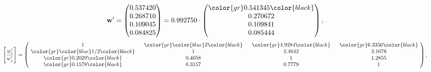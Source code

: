 \begin{example}
\begin{equation*}
\mathbf{w}^{\prime} =
\begin{pmatrix}
0.537420\\
0.268710\\
0.109045\\
0.084825
\end{pmatrix} =
0.992750\cdot
\begin{pmatrix}
\color{gr} 0.541345\color{black} \\
0.270672\\
0.109841\\
0.085444
\end{pmatrix},
\end{equation*}
\begin{equation*}
\left[ \frac{{w}^{\prime}_i}{{w}^{\prime}_j} \right] =
\begin{pmatrix}
$\,\,$ 1 $\,\,$ & $\,\,$\color{gr} \color{blue} 2\color{black} $\,\,$ & $\,\,$\color{gr} 4.9284\color{black} $\,\,$ & $\,\,$\color{gr} 6.3356\color{black} $\,\,$ \\
$\,\,$\color{gr} \color{blue}  1/2\color{black} $\,\,$ & $\,\,$ 1 $\,\,$ & $\,\,$2.4642$\,\,$ & $\,\,$3.1678  $\,\,$ \\
$\,\,$\color{gr} 0.2029\color{black} $\,\,$ & $\,\,$0.4058$\,\,$ & $\,\,$ 1 $\,\,$ & $\,\,$1.2855 $\,\,$ \\
$\,\,$\color{gr} 0.1578\color{black} $\,\,$ & $\,\,$0.3157$\,\,$ & $\,\,$0.7779$\,\,$ & $\,\,$ 1  $\,\,$ \\
\end{pmatrix},
\end{equation*}
\end{example}
\newpage
